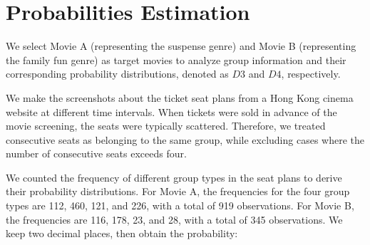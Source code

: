 \section{Probabilities Estimation}\label{appen_3}
We select Movie A (representing the suspense genre) and Movie B (representing the family fun genre) as target movies to analyze group information and their corresponding probability distributions, denoted as $D3$ and $D4$, respectively. 














We make the screenshots about the ticket seat plans from a Hong Kong cinema website at different time intervals. When tickets were sold in advance of the movie screening, the seats were typically scattered. Therefore, we treated consecutive seats as belonging to the same group, while excluding cases where the number of consecutive seats exceeds four. 

We counted the frequency of different group types in the seat plans to derive their probability distributions. For Movie A, the frequencies for the four group types are 112, 460, 121, and 226, with a total of 919 observations. For Movie B, the frequencies are 116, 178, 23, and 28, with a total of 345 observations. We keep two decimal places, then obtain the probability:

